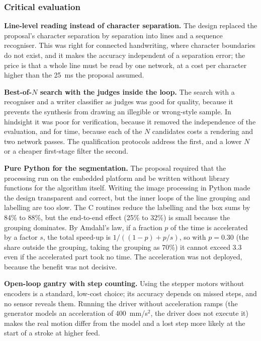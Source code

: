     \subsubsection{Critical evaluation}
    \label{sec:dis-crit}

        \textbf{Line-level reading instead of character separation.}
        The design replaced the proposal's character separation by separation into lines and a sequence recogniser.
        This was right for connected handwriting, where character boundaries do not exist, and it makes the accuracy independent of a separation error; the price is that a whole line must be read by one network, at a cost per character higher than the 25~ms the proposal assumed.

        \textbf{Best-of-$N$ search with the judges inside the loop.}
        The search with a recogniser and a writer classifier as judges was good for quality, because it prevents the synthesis from drawing an illegible or wrong-style sample.
        In hindsight it was poor for verification, because it removed the independence of the evaluation, and for time, because each of the $N$ candidates costs a rendering and two network passes.
        The qualification protocols address the first, and a lower $N$ or a cheaper first-stage filter the second.

        \textbf{Pure Python for the segmentation.}
        The proposal required that the processing run on the embedded platform and be written without library functions for the algorithm itself.
        Writing the image processing in Python made the design transparent and correct, but the inner loops of the line grouping and labelling are too slow.
        The C routines reduce the labelling and the box sums by 84\% to 88\%, but the end-to-end effect (25\% to 32\%) is small because the grouping dominates.
        By Amdahl's law, if a fraction $p$ of the time is accelerated by a factor $s$, the total speed-up is $1/((1-p)+p/s)$, so with $p=0.30$ (the share outside the grouping, taking the grouping as 70\%) it cannot exceed $3.3$ even if the accelerated part took no time.
        The acceleration was not deployed, because the benefit was not decisive.

        \textbf{Open-loop gantry with step counting.}
        Using the stepper motors without encoders is a standard, low-cost choice; its accuracy depends on missed steps, and no sensor reveals them.
        Running the driver without acceleration ramps (the generator models an acceleration of 400~mm/s$^2$, the driver does not execute it) makes the real motion differ from the model and a lost step more likely at the start of a stroke at higher feed.


